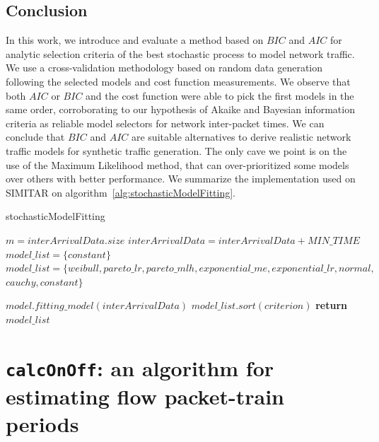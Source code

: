 \subsection{Conclusion}


In this work, we introduce and evaluate a method based on $BIC$ and $AIC$ for analytic selection criteria of the best stochastic process to model network traffic. We use a cross-validation methodology based on random data generation following the selected models and cost function measurements. We observe that both $AIC$ or $BIC$ and the cost function were able to pick the first models in the same order, corroborating to our hypothesis of Akaike and Bayesian information criteria as reliable model selectors for network inter-packet times. We can conclude that $BIC$ and $AIC$ are suitable alternatives to derive realistic network traffic models for synthetic traffic generation. The only cave we point is on the use of the Maximum Likelihood method, that can over-prioritized some models over others with better performance. We summarize the implementation used on SIMITAR on algorithm~\ref{alg:stochasticModelFitting}.

\begin{algorithm}[ht!]
    \caption{stochasticModelFitting}
    \label{alg:stochasticModelFitting}
    \begin{algorithmic}[1]
        \small        {}
        \State $m = interArrivalData.size$
        \State $interArrivalData = interArrivalData + MIN\_TIME$
        \State $model\_list = \{constant\}$
        \Else
        \State $model\_list = \{weibull, pareto\_lr, pareto\_mlh, exponential\_me, exponential\_lr, normal,$
        \State $cauchy, constant\}$
        \EndIf
        
        \State $model.fitting\_model(interArrivalData)$
        \EndFor
        \State $model\_list.sort(criterion)$
        \State \textbf{return} $model\_list$
        \EndFunction
    \end{algorithmic}
\end{algorithm}



\section{\texttt{calcOnOff}: an algorithm for estimating flow packet-train periods}


